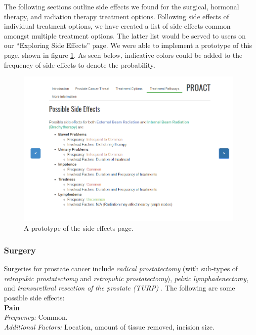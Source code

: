 \documentclass[journal]{vgtc}                %
\begin{document}
                The following sections outline side effects we found for the surgical, hormonal therapy, and radiation therapy treatment options.
                Following side effects of individual treatment options, we have created a list of side effects common amongst multiple treatment options.
                The latter list would be served to users on our ``Exploring Side Effects'' page. We were able to implement a prototype of this page, shown in figure \ref{fig:side}.
                As seen below, indicative colors could be added to the frequency of side effects to denote the probability.
                \begin{figure}[!ht]
                    \includegraphics[width=\columnwidth]{sideeffects.png}
                    \caption{A prototype of the side effects page.}
                    \label{fig:side}
                \end{figure}

                \subsubsection{Surgery}
                        Surgeries for prostate cancer include \textit{radical prostatectomy} (with sub-types of \textit{retropubic prostatectomy} and \textit{retropubic prostatectomy}), \textit{pelvic lymphadenectomy}, and \textit{transurethral resection of the prostate (TURP)} \cite{PDQProstateCancer:2016}.
                        The following are some possible side effects: \\

                        \textbf{Pain}
                        \\ \textit{Frequency:} Common.
                        \\ \textit{Additional Factors:} Location, amount of tissue removed, incision size.
                        \newline
\end{document}
